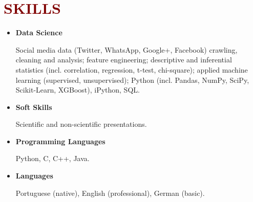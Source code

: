 

\section*{\textcolor{maroon}{\normalsize SKILLS}}

\begin{itemize}[]


\item \textbf{Data Science} 

Social media data (Twitter, WhatsApp, Google+, Facebook) crawling, cleaning and analysis; feature engineering; descriptive and inferential statistics (incl. correlation, regression, t-test, chi-square); applied machine learning (supervised, unsupervised); Python (incl. Pandas, NumPy, SciPy, Scikit-Learn, XGBoost), iPython, SQL.

\item \textbf{Soft Skills} 

Scientific and non-scientific presentations.

\item \textbf{Programming Languages} 

Python, C, C++, Java.

\item \textbf{Languages} 

Portuguese (native), English (professional), German (basic).

\end{itemize}


